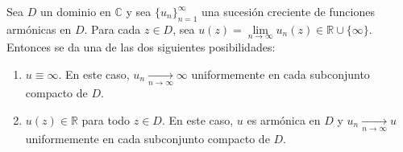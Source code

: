 \begin{theorem}
    Sea $D$ un dominio en $\mathbb{C}$ y sea $\{u_n\}_{n=1}^\infty$ una sucesión creciente de funciones armónicas en $D$.
    Para cada $z \in D$, sea $u(z) = \lim\limits_{n \to \infty} u_n(z) \in \mathbb{R} \cup \{\infty\}$.
    Entonces se da una de las dos siguientes posibilidades:
    \begin{enumerate}
        \item $u \equiv \infty$.
              En este caso, $u_n \xrightarrow[n \to \infty]{} \infty$ uniformemente en cada subconjunto compacto de $D$.
        \item $u(z) \in \mathbb{R}$ para todo $z \in D$.
              En este caso, $u$ es armónica en $D$ y $u_n \xrightarrow[n \to \infty]{} u$ uniformemente en cada subconjunto compacto de $D$.
    \end{enumerate}
\end{theorem}


